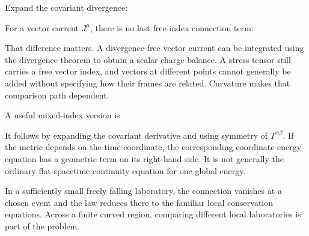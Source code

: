 \documentclass[
  11pt,
  letterpaper,
  oneside,
  openany]{scrbook}
\begin{document}
Expand the covariant divergence:

\begin{center}
\begingroup
{}
\ifdim\wd\grmathbox>\linewidth
\resizebox{\linewidth}{!}{\usebox{\grmathbox}}
\else\usebox{\grmathbox}\fi
\endgroup
\end{center}

For a vector current \(J^\mu\), there is no last free-index connection
term:

\begin{center}
\begingroup
{}
\ifdim\wd\grmathbox>\linewidth
\resizebox{\linewidth}{!}{\usebox{\grmathbox}}
\else\usebox{\grmathbox}\fi
\endgroup
\end{center}

That difference matters. A divergence-free vector current can be
integrated using the divergence theorem to obtain a scalar charge
balance. A stress tensor still carries a free vector index, and vectors
at different points cannot generally be added without specifying how
their frames are related. Curvature makes that comparison path
dependent.

A useful mixed-index version is

\begin{center}
\begingroup
{}
\ifdim\wd\grmathbox>\linewidth
\resizebox{\linewidth}{!}{\usebox{\grmathbox}}
\else\usebox{\grmathbox}\fi
\endgroup
\end{center}

It follows by expanding the covariant derivative and using symmetry of
\(T^{\alpha\beta}\). If the metric depends on the time coordinate, the
corresponding coordinate energy equation has a geometric term on its
right-hand side. It is not generally the ordinary flat-spacetime
continuity equation for one global energy.

In a sufficiently small freely falling laboratory, the connection
vanishes at a chosen event and the law reduces there to the familiar
local conservation equations. Across a finite curved region, comparing
different local laboratories is part of the problem.
\end{document}
